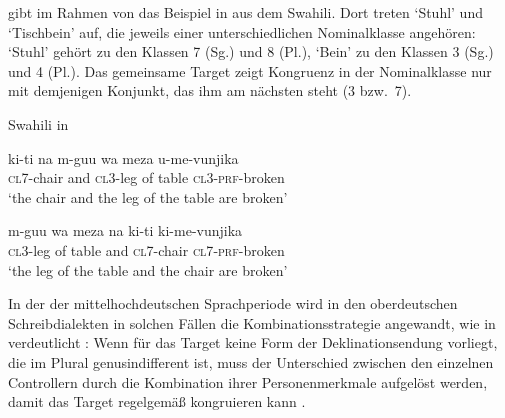 \citet[169]{corbett2006} gibt im Rahmen von  das Beispiel
in  aus dem Swahili. Dort treten  `Stuhl' und
 `Tischbein' auf, die jeweils einer unterschiedlichen
Nominalklasse angehören:  `Stuhl' gehört zu den Klassen 7 (Sg.) und 8
(Pl.),  `Bein' zu den Klassen 3 (Sg.) und 4 (Pl.). Das gemeinsame
Target  zeigt Kongruenz in der Nominalklasse nur mit
demjenigen Konjunkt, das ihm am nächsten steht (3 bzw.~7).

\begin{exe}
\ex \label{ex:cca}
	\langinfo%
		{Swahili}%
		{}%
		{\cite[45]{bokamba1985} in \cite[169]{corbett2006}}
	\begin{xlist}
	\ex \label{ex:cca_1}
		\gll ki-ti na m-guu wa meza u-me-vunjika \\
			\textsc{cl7}-chair and \textsc{cl3}-leg of table
			\textsc{cl3}-\textsc{prf}-broken \\
		\trans `the chair and the leg of the table are broken'

	\ex \label{ex:cca_2}
		\gll m-guu wa meza na ki-ti ki-me-vunjika \\
			\textsc{cl3}-leg of table and \textsc{cl7}-chair
			\textsc{cl7}-\textsc{prf}-broken \\
		\trans `the leg of the table and the chair are broken'
	\end{xlist}
\end{exe}

In der  der mittelhochdeutschen
Sprachperiode wird in den oberdeutschen Schreibdialekten in
solchen Fällen die Kombinationsstrategie angewandt, wie in
 verdeutlicht
\autocites[vgl.][312]{grimm1890}[329]{grimm1898}[39--41]{behaghel1928}[187--189]{dal2014}:
Wenn für das Target keine Form der Deklinationsendung vorliegt, die im Plural
genusindifferent ist, muss der Unterschied zwischen den
einzelnen Controllern durch die Kombination ihrer
Personenmerkmale aufgelöst werden, damit das Target regelgemäß kongruieren kann
\autocites[vgl.][182--193]{corbett1983}[269--306]{corbett1991}[243--263]{corbett2006}.

